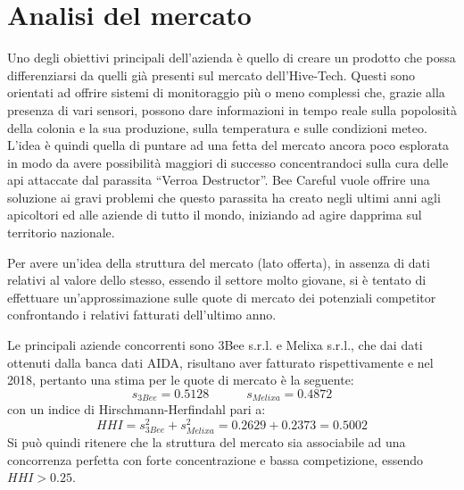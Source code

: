 \section{Analisi del mercato}
Uno degli obiettivi principali dell’azienda è quello di creare un prodotto che
possa differenziarsi da quelli già presenti sul mercato dell’Hive-Tech.
Questi sono orientati ad offrire sistemi di monitoraggio più o meno complessi
che, grazie alla presenza di vari sensori, possono dare informazioni in tempo
reale sulla popolosità della colonia e la sua produzione, sulla temperatura e
sulle condizioni meteo. L’idea è quindi quella di puntare ad una fetta del
mercato ancora poco esplorata in modo da avere possibilità maggiori di successo
concentrandoci sulla cura delle api attaccate dal parassita “Verroa Destructor”.
Bee Careful vuole offrire una soluzione ai gravi problemi che questo parassita
ha creato negli ultimi anni agli apicoltori ed alle aziende di tutto il mondo,
iniziando ad agire dapprima sul territorio nazionale.

Per avere un’idea della struttura del mercato (lato offerta), in assenza di dati
relativi al valore dello stesso, essendo il settore molto giovane, si è tentato
di effettuare un’approssimazione sulle quote di mercato dei potenziali
competitor confrontando i relativi fatturati dell’ultimo anno.

Le principali aziende concorrenti sono 3Bee s.r.l. e Melixa s.r.l., che dai dati
ottenuti dalla banca dati AIDA\cite{aida}, risultano aver fatturato
rispettivamente   e  nel 2018, pertanto una stima per le
quote di mercato è la seguente:
\begin{displaymath}
	s_{3Bee} = 0.5128   \qquad \quad s_{Melixa} = 0.4872
\end{displaymath}
con un indice di Hirschmann-Herfindahl pari a:
\begin{displaymath}
	HHI = s^2_{3Bee} + s^2_{Melixa} = 0.2629 + 0.2373 = 0.5002
\end{displaymath}
Si può quindi ritenere che la struttura del mercato sia associabile ad una
concorrenza perfetta con forte concentrazione e bassa competizione, essendo $HHI
> 0.25$.

